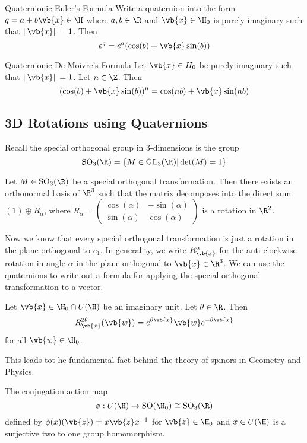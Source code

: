 \documentclass[a4paper]{article}
\begin{document}
\begin{prp}{Quaternionic Euler's Formula}{} Write a quaternion into the form $q=a+b\vb{x}\in\H$ where $a,b\in\R$ and $\vb{x}\in\H_0$ is purely imaginary such that $\|\vb{x}\|=1$. Then $$e^q=e^a(\cos(b)+\vb{x}\sin(b))$$
\end{prp}

\begin{prp}{Quaternionic De Moivre's Formula}{} Let $\vb{x}\in H_0$ be purely imaginary such that $\|\vb{x}\|=1$. Let $n\in\Z$. Then $$(\cos(b)+\vb{x}\sin(b))^n=\cos(nb)+\vb{x}\sin(nb)$$
\end{prp}

\subsection{3D Rotations using Quaternions}
Recall the special orthogonal group in $3$-dimensions is the group $$\text{SO}_3(\R)=\{M\in\text{GL}_3(\R)|\det(M)=1\}$$

\begin{prp}{}{} Let $M\in\text{SO}_3(\R)$ be a special orthogonal transformation. Then there exists an orthonormal basis of $\R^3$ such that the matrix decomposes into the direct sum $(1)\oplus R_\alpha$, where $R_\alpha=\begin{pmatrix}
\cos(\alpha) & -\sin(\alpha)\\
\sin(\alpha) & \cos(\alpha)
\end{pmatrix}$ is a rotation in $\R^2$. 
\end{prp}

Now we know that every special orthogonal transformation is just a rotation in the plane orthogonal to $e_1$. In generality, we write $R_{\vb{x}}^\alpha$ for the anti-clockwise rotation in angle $\alpha$ in the plane orthogonal to $\vb{x}\in\R^3$. We can use the quaternions to write out a formula for applying the special orthogonal transformation to a vector. 

\begin{lmm}{}{} Let $\vb{x}\in\H_0\cap U(\H)$ be an imaginary unit. Let $\theta\in\R$. Then $$R_{\vb{x}}^{2\theta}(\vb{w})=e^{\theta\vb{x}}\vb{w}e^{-\theta\vb{x}}$$ for all $\vb{w}\in\H_0$. 
\end{lmm}

This leads tot he fundamental fact behind the theory of spinors in Geometry and Physics. 

\begin{thm}{}{} The conjugation action map $$\phi:U(\H)\to\text{SO}(\H_0)\cong\text{SO}_3(\R)$$ defined by $\phi(x)(\vb{z})=x\vb{z}x^{-1}$ for $\vb{z}\in\H_0$ and $x\in U(\H)$ is a surjective two to one group homomorphism. 
\end{thm}
\end{document}
